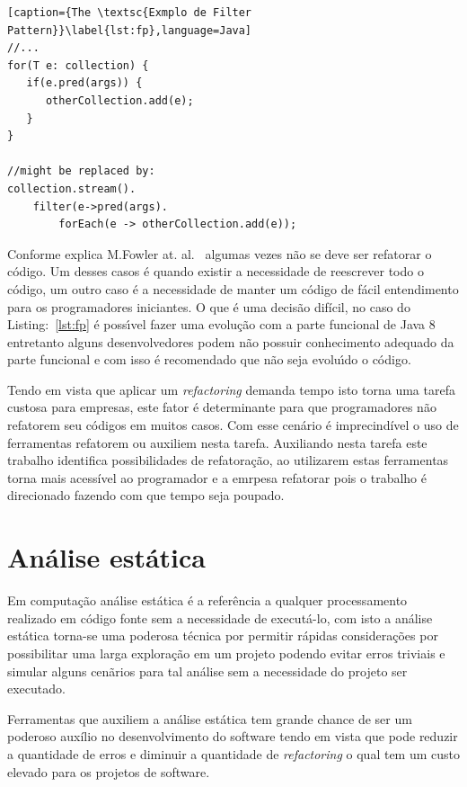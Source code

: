 \begin{lstlisting}[caption={The \textsc{Exmplo de Filter Pattern}}\label{lst:fp},language=Java] 
//...
for(T e: collection) {
   if(e.pred(args)) {
      otherCollection.add(e);
   }
}

//might be replaced by:
collection.stream().
	filter(e->pred(args).
		forEach(e -> otherCollection.add(e));
\end{lstlisting}


Conforme explica M.Fowler at. al.~\cite{martinFowlerRafactoring} algumas vezes n\~{a}o se deve ser refatorar o c\'{o}digo. Um desses casos \'{e} quando existir a necessidade de reescrever todo o c\'{o}digo, um outro caso \'{e} a necessidade de manter um  c\'{o}digo de f\'{a}cil entendimento para os programadores iniciantes. O que \'{e} uma decis\~{a}o dif\'{i}cil, no caso do Listing:~\ref{lst:fp} \'{e} poss\'{\i}vel fazer uma evolu\c{c}\~{a}o com a parte funcional de Java 8 entretanto alguns desenvolvedores podem n\~{a}o possuir  conhecimento adequado da parte funcional e com isso \'{e} recomendado que n\~{a}o seja evolu\'{\i}do o c\'{o}digo.


Tendo em vista que aplicar um \textit{refactoring} demanda tempo isto torna uma tarefa custosa para empresas, este fator \'{e} determinante para que programadores n\~{a}o refatorem seu c\'{o}digos em muitos casos. Com esse cen\'{a}rio \'{e} imprecind\'{i}vel o uso de ferramentas refatorem ou auxiliem nesta tarefa. Auxiliando nesta tarefa este trabalho identifica possibilidades de refatora\c{c}\~{a}o, ao utilizarem estas ferramentas torna mais acessível ao programador e a emrpesa refatorar pois o trabalho é direcionado fazendo com que tempo seja poupado.



\section{Análise estática}\label{sec:as}

Em computa\c{c}\~{a}o an\'{a}lise est\'{a}tica \'{e} a refer\^{e}ncia a qualquer processamento realizado em c\'{o}digo fonte sem a necessidade de execut\'{a}-lo, com isto a an\'{a}lise est\'{a}tica torna-se uma poderosa t\'{e}cnica por permitir r\'{a}pidas considera\c{c}\~{o}es por possibilitar uma larga explora\c{c}\~{a}o em um projeto podendo evitar erros triviais e simular alguns cen\~{a}rios para tal an\'{a}lise sem a necessidade do projeto ser executado.

Ferramentas que auxiliem a an\'{a}lise est\'{a}tica tem grande chance de ser um poderoso aux\'{i}lio no desenvolvimento do software tendo em vista que pode reduzir a quantidade de erros e diminuir a quantidade de \textit{refactoring} o qual tem um custo elevado para os projetos de software.

